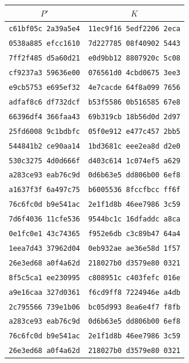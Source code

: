 \begin{table}
\begin{center}
\begin{tabular}{|c|c|}
\hline
$P'$ & $K$\\
\hline
\texttt{c61bf05c 2a39a5e4} & \texttt{11ec9f16 5edf2206 2eca}\\
\texttt{0538a885 efcc1610} & \texttt{7d227785 08f40902 5443}\\
\texttt{7ff2f485 d5a60d21} & \texttt{e0d9bb12 8807920c 5c08}\\
\texttt{cf9237a3 59636e00} & \texttt{076561d0 4cbd0675 3ee3}\\
\texttt{e9cb5753 e695ef32} & \texttt{4e7cacde 64f8a099 7656}\\
\texttt{adfaf8c6 df732dcf} & \texttt{b53f5586 0b516585 67e8}\\
\texttt{66396df4 366faa43} & \texttt{69b319cb 18b56d0d 2d97}\\
\texttt{25fd6008 9c1bdbfc} & \texttt{05f0e912 e477c457 2bb5}\\
\texttt{544841b2 ce90aa14} & \texttt{1bd3681c eee2ea8d d2e0}\\
\texttt{530c3275 4d0d666f} & \texttt{d403c614 1c074ef5 a629}\\
\texttt{a283ce93 eab76c9d} & \texttt{0d6b63e5 dd806b00 6ef8}\\
\texttt{a1637f3f 6a497c75} & \texttt{b6005536 8fccfbcc ff6f}\\
\texttt{76c6fc0d b9e541ac} & \texttt{2e1f1d8b 46ee7986 3c59}\\
\texttt{7d6f4036 11cfe536} & \texttt{9544bc1c 16dfaddc a8ca}\\
\texttt{0e1fc0e1 43c74365} & \texttt{f952e6db c3c89b47 64a4}\\
\texttt{1eea7d43 37962d04} & \texttt{0eb932ae ae36e58d 1f57}\\
\texttt{26e3ed68 a0f4a62d} & \texttt{218027b0 d3579e80 0321}\\
\texttt{8f5c5ca1 ee230995} & \texttt{c808951c c403fefc 016e}\\
\texttt{a9e16caa 327d0361} & \texttt{f6cd9ff8 7224946e a4db}\\
\texttt{2c795566 739e1b06} & \texttt{bc05d993 8ea6e4f7 f8fb}\\
\texttt{a283ce93 eab76c9d} & \texttt{0d6b63e5 dd806b00 6ef8}\\
\texttt{76c6fc0d b9e541ac} & \texttt{2e1f1d8b 46ee7986 3c59}\\
\texttt{26e3ed68 a0f4a62d} & \texttt{218027b0 d3579e80 0321}\\

\end{tabular}
\end{center}
\end{table}
